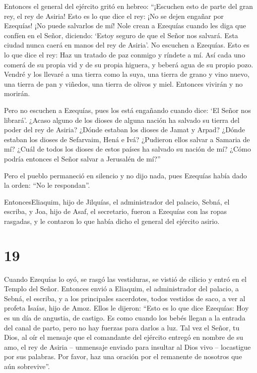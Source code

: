  Entonces el general del ejército gritó en hebreo:
``¡Escuchen esto de parte del gran rey, el rey de Asiria! 
Esto es lo que dice el rey: ¡No se dejen engañar por Ezequías! ¡No puede
salvarlos de mí!  Nole crean a Ezequías cuando les diga que
confíen en el Señor, diciendo: `Estoy seguro de que el Señor nos
salvará. Esta ciudad nunca caerá en manos del rey de Asiria'.
 No escuchen a Ezequías. Esto es lo que dice el rey: Haz un
tratado de paz conmigo y ríndete a mí. Así cada uno comerá de su propia
vid y de su propia higuera, y beberá agua de su propio pozo.
 Vendré y los llevaré a una tierra como la suya, una tierra
de grano y vino nuevo, una tierra de pan y viñedos, una tierra de olivos
y miel. Entonces vivirán y no morirán.

Pero no escuchen a Ezequías, pues los está engañando cuando dice: `El
Señor nos librará'.  ¿Acaso alguno de los dioses de alguna
nación ha salvado su tierra del poder del rey de Asiria? 
¿Dónde estaban los dioses de Jamat y Arpad? ¿Dónde estaban los dioses de
Sefarvaim, Hená e Ivá? ¿Pudieron ellos salvar a Samaria de mí?
 ¿Cuál de todos los dioses de estos países ha salvado su
nación de mí? ¿Cómo podría entonces el Señor salvar a Jerusalén de mí?''

 Pero el pueblo permaneció en silencio y no dijo nada, pues
Ezequías había dado la orden: ``No le respondan''.

 EntoncesEliaquim, hijo de Jilquías, el administrador del
palacio, Sebná, el escriba, y Joa, hijo de Asaf, el secretario, fueron a
Ezequías con las ropas rasgadas, y le contaron lo que había dicho el
general del ejército asirio.

\hypertarget{section-18}{%
\section{19}\label{section-18}}

 Cuando Ezequías lo oyó, se rasgó las vestiduras, se vistió
de cilicio y entró en el Templo del Señor.  Entonces envió a
Eliaquim, el administrador del palacio, a Sebná, el escriba, y a los
principales sacerdotes, todos vestidos de saco, a ver al profeta Isaías,
hijo de Amoz.  Ellos le dijeron: ``Esto es lo que dice
Ezequías: Hoy es un día de angustia, de castigo. Es como cuando los
bebés llegan a la entrada del canal de parto, pero no hay fuerzas para
darlos a luz.  Tal vez el Señor, tu Dios, al oír el mensaje
que el comandante del ejército entregó en nombre de su amo, el rey de
Asiria -- unmensaje enviado para insultar al Dios vivo -- locastigue por
sus palabras. Por favor, haz una oración por el remanente de nosotros
que aún sobrevive''.

